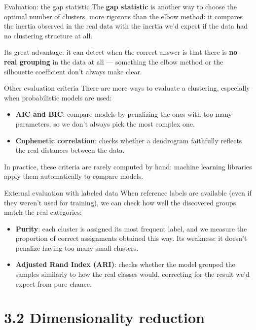 \documentclass[aspectratio=169]{beamer}
\begin{document}
\begin{frame}{Evaluation: the gap statistic}
  \small
  The \textbf{gap statistic} is another way to choose the optimal number of clusters, more rigorous than the elbow method: it compares the inertia observed in the real data with the inertia we'd expect if the data had no clustering structure at all.

  Its great advantage: it can detect when the correct answer is that there is \textbf{no real grouping} in the data at all --- something the elbow method or the silhouette coefficient don't always make clear.
\end{frame}

\begin{frame}{Other evaluation criteria}
  \small
  There are more ways to evaluate a clustering, especially when probabilistic models are used:
  \begin{itemize}
    \item \textbf{AIC and BIC}: compare models by penalizing the ones with too many parameters, so we don't always pick the most complex one.
    \item \textbf{Cophenetic correlation}: checks whether a dendrogram faithfully reflects the real distances between the data.
  \end{itemize}
  In practice, these criteria are rarely computed by hand: machine learning libraries apply them automatically to compare models.
\end{frame}

\begin{frame}{External evaluation with labeled data}
  \small
  When reference labels are available (even if they weren't used for training), we can check how well the discovered groups match the real categories:
  \begin{itemize}
    \item \textbf{Purity}: each cluster is assigned its most frequent label, and we measure the proportion of correct assignments obtained this way. Its weakness: it doesn't penalize having too many small clusters.
    \item \textbf{Adjusted Rand Index (ARI)}: checks whether the model grouped the samples similarly to how the real classes would, correcting for the result we'd expect from pure chance.
  \end{itemize}
\end{frame}

\section{3.2 Dimensionality reduction}
\end{document}
